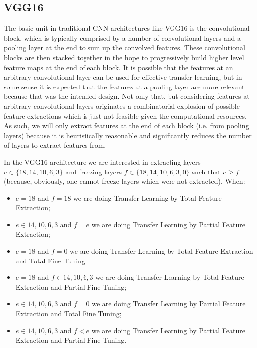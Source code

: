 \subsection{VGG16}

The basic unit in traditional \ac{CNN} architectures like VGG16 is the convolutional block, which is typically comprised by a number of convolutional layers and a pooling layer at the end to sum up the convolved features. These convolutional blocks are then stacked together in the hope to progressively build higher level feature maps at the end of each block. It is possible that the features at an arbitrary convolutional layer can be used for effective transfer learning, but in some sense it is expected that the features at a pooling layer are more relevant because that was the intended design. Not only that, but considering features at arbitrary convolutional layers originates a combinatorial explosion of possible feature extractions which is just not feasible given the computational resources. As such, we will only extract features at the end of each block (i.e. from pooling layers) because it is heuristically reasonable and significantly reduces the number of layers to extract features from.

In the VGG16 architecture we are interested in extracting layers $e \in \{18,14,10,6,3\}$ and freezing layers $f \in \{18,14,10,6,3,0\}$ such that $e \geq f$ (because, obviously, one cannot freeze layers which were not extracted). When:


\begin{itemize}
    \item $e = 18$ and $f = 18$ we are doing Transfer Learning by Total Feature Extraction;
    \item $e \in {14,10,6,3}$ and $f = e$ we are doing Transfer Learning by Partial Feature Extraction;

    \item $e = 18$ and $f = 0$ we are doing Transfer Learning by Total Feature Extraction and Total Fine Tuning;
    \item $e = 18$ and $f \in {14,10,6,3}$ we are doing Transfer Learning by Total Feature Extraction and Partial Fine Tuning;

    \item $e \in {14,10,6,3}$ and $f = 0$ we are doing Transfer Learning by Partial Feature Extraction and Total Fine Tuning;
    \item $e \in {14,10,6,3}$ and $f < e$ we are doing Transfer Learning by Partial Feature Extraction and Partial Fine Tuning.
\end{itemize}

